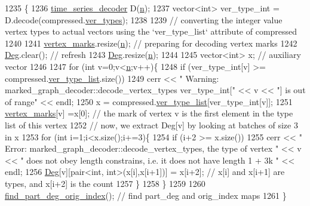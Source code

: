 \begin{DoxyCode}
1235 \{
1236   \hyperlink{classtime__series__decoder}{time\_series\_decoder} D(\hyperlink{classmarked__graph__decoder_aefc93611bc4a3e9a5d3956d97649a0e9}{n});
1237   vector<int> ver\_type\_int = D.decode(compressed.\hyperlink{classmarked__graph__compressed_af446cc5e23c241a92b76642fd5ebc403}{ver\_types});
1238 
1239   \textcolor{comment}{// converting the integer value vertex types to actual vectors using the `ver\_type\_list` attribute of
       compressed}
1240 
1241   \hyperlink{classmarked__graph__decoder_a98be932a5abff7efbc8dd4290268b69a}{vertex\_marks}.resize(\hyperlink{classmarked__graph__decoder_aefc93611bc4a3e9a5d3956d97649a0e9}{n}); \textcolor{comment}{// preparing for decoding vertex marks}
1242   \hyperlink{classmarked__graph__decoder_a5040ad86467693eab415f615408bfb9e}{Deg}.clear(); \textcolor{comment}{// refresh}
1243   \hyperlink{classmarked__graph__decoder_a5040ad86467693eab415f615408bfb9e}{Deg}.resize(\hyperlink{classmarked__graph__decoder_aefc93611bc4a3e9a5d3956d97649a0e9}{n});
1244 
1245   vector<int> x; \textcolor{comment}{// auxiliary vector}
1246 
1247   \textcolor{keywordflow}{for} (\textcolor{keywordtype}{int} v=0;v<\hyperlink{classmarked__graph__decoder_aefc93611bc4a3e9a5d3956d97649a0e9}{n};v++)\{
1248     \textcolor{keywordflow}{if} (ver\_type\_int[v] >= compressed.\hyperlink{classmarked__graph__compressed_af2e3e55223d436628a02758dfae88493}{ver\_type\_list}.size())
1249       cerr << \textcolor{stringliteral}{" Warning: marked\_graph\_decoder::decode\_vertex\_types ver\_type\_int["} << v << \textcolor{stringliteral}{"] is out of
       range"} << endl;
1250     x = compressed.\hyperlink{classmarked__graph__compressed_af2e3e55223d436628a02758dfae88493}{ver\_type\_list}[ver\_type\_int[v]];
1251     \hyperlink{classmarked__graph__decoder_a98be932a5abff7efbc8dd4290268b69a}{vertex\_marks}[v] =x[0]; \textcolor{comment}{// the mark of vertex v is the first element in the type list of
       this vertex}
1252     \textcolor{comment}{// now, we extract Deg[v] by looking at batches of size 3 in x}
1253     \textcolor{keywordflow}{for} (\textcolor{keywordtype}{int} i=1;i<x.size();i+=3)\{
1254       \textcolor{keywordflow}{if} (i+2 >= x.size())
1255         cerr << \textcolor{stringliteral}{" Error: marked\_graph\_decoder::decode\_vertex\_types, the type of vertex "} << v << \textcolor{stringliteral}{" does not
       obey length constrains, i.e. it does not have length 1 + 3k "} << endl;
1256           \hyperlink{classmarked__graph__decoder_a5040ad86467693eab415f615408bfb9e}{Deg}[v][pair<int, int>(x[i],x[i+1])] = x[i+2]; \textcolor{comment}{// x[i] and x[i+1] are types, and x[i+2] is the
       count}
1257     \}
1258   \}
1259 
1260   \hyperlink{classmarked__graph__decoder_a1e035914395d2a3a50064b758c478ffd}{find\_part\_deg\_orig\_index}(); \textcolor{comment}{// find part\_deg and orig\_index maps}
1261 \}
\end{DoxyCode}
